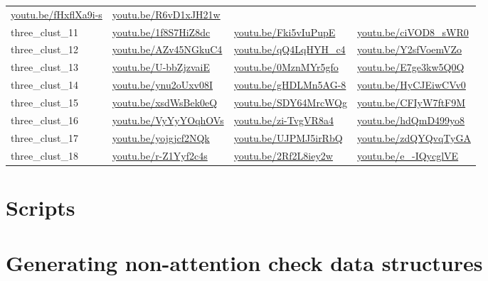 \documentclass[
  11pt,
  a4paper,
]{report}
\begin{document}
\begin{longtable}[]{@{}llll@{}}
\href{https://youtu.be/fHxflXa9i-s}{youtu.be/fHxflXa9i-s} &
\href{https://youtu.be/R6vD1xJH21w}{youtu.be/R6vD1xJH21w} \\
three\_clust\_11 &
\href{https://youtu.be/1f8S7HiZ8dc}{youtu.be/1f8S7HiZ8dc} &
\href{https://youtu.be/Fki5vIuPupE}{youtu.be/Fki5vIuPupE} &
\href{https://youtu.be/ciVOD8_sWR0}{youtu.be/ciVOD8\_sWR0} \\
three\_clust\_12 &
\href{https://youtu.be/AZv45NGkuC4}{youtu.be/AZv45NGkuC4} &
\href{https://youtu.be/qQ4LqHYH_c4}{youtu.be/qQ4LqHYH\_c4} &
\href{https://youtu.be/Y2sfVoemVZo}{youtu.be/Y2sfVoemVZo} \\
three\_clust\_13 &
\href{https://youtu.be/U-bbZjzvaiE}{youtu.be/U-bbZjzvaiE} &
\href{https://youtu.be/0MznMYr5gfo}{youtu.be/0MznMYr5gfo} &
\href{https://youtu.be/E7ge3kw5Q0Q}{youtu.be/E7ge3kw5Q0Q} \\
three\_clust\_14 &
\href{https://youtu.be/ynu2oUxv08I}{youtu.be/ynu2oUxv08I} &
\href{https://youtu.be/gHDLMn5AG-8}{youtu.be/gHDLMn5AG-8} &
\href{https://youtu.be/HyCJEiwCVv0}{youtu.be/HyCJEiwCVv0} \\
three\_clust\_15 &
\href{https://youtu.be/xsdWsBek0eQ}{youtu.be/xsdWsBek0eQ} &
\href{https://youtu.be/SDY64MrcWQg}{youtu.be/SDY64MrcWQg} &
\href{https://youtu.be/CFIyW7ftF9M}{youtu.be/CFIyW7ftF9M} \\
three\_clust\_16 &
\href{https://youtu.be/VyYyYOqhOVs}{youtu.be/VyYyYOqhOVs} &
\href{https://youtu.be/zi-TvgVR8a4}{youtu.be/zi-TvgVR8a4} &
\href{https://youtu.be/hdQmD499yo8}{youtu.be/hdQmD499yo8} \\
three\_clust\_17 &
\href{https://youtu.be/yojgjcf2NQk}{youtu.be/yojgjcf2NQk} &
\href{https://youtu.be/UJPMJ5irRbQ}{youtu.be/UJPMJ5irRbQ} &
\href{https://youtu.be/zdQYQvqTyGA}{youtu.be/zdQYQvqTyGA} \\
three\_clust\_18 &
\href{https://youtu.be/r-Z1Yyf2c4s}{youtu.be/r-Z1Yyf2c4s} &
\href{https://youtu.be/2Rf2L8iey2w}{youtu.be/2Rf2L8iey2w} &
\href{https://youtu.be/e_-IQycglVE}{youtu.be/e\_-IQycglVE} \\

\end{longtable}

\section{Scripts}\label{scripts-1}

\section{Generating non-attention check data
structures}\label{generating-non-attention-check-data-structures}
\end{document}
